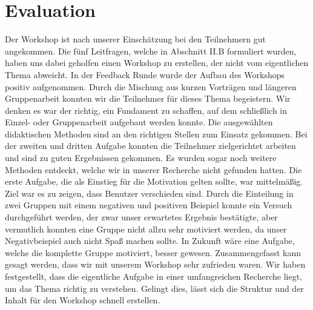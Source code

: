 \section{Evaluation}
Der Workshop ist nach unserer Einschätzung bei den Teilnehmern gut angekommen. Die fünf Leitfragen, welche in Abschnitt II.B formuliert wurden, haben uns dabei geholfen einen Workshop zu erstellen, der nicht vom eigentlichen Thema abweicht. 
In der Feedback Runde wurde der Aufbau des Workshops positiv aufgenommen. Durch die Mischung aus kurzen Vorträgen und längeren Gruppenarbeit konnten wir die Teilnehmer für dieses Thema begeistern. Wir denken es war der richtig, ein Fundament zu schaffen, auf dem schließlich in Einzel- oder Gruppenarbeit aufgebaut werden konnte. 
Die ausgewählten didaktischen Methoden sind an den richtigen Stellen zum Einsatz gekommen. Bei der zweiten und dritten Aufgabe konnten die Teilnehmer zielgerichtet arbeiten und sind zu guten Ergebnissen gekommen. Es wurden sogar noch weitere Methoden entdeckt, welche wir in unserer Recherche nicht gefunden hatten.  Die erste Aufgabe, die als Einstieg für die Motivation gelten sollte, war mittelmäßig. Ziel war es zu zeigen, dass Benutzer verschieden sind. Durch die Einteilung in zwei Gruppen mit einem negativen und positiven Beispiel konnte ein Versuch durchgeführt werden, der zwar unser erwartetes Ergebnis bestätigte, aber vermutlich konnten eine Gruppe nicht allzu sehr motiviert werden, da unser Negativbeispiel auch nicht Spaß machen sollte. In Zukunft wäre eine Aufgabe, welche die komplette Gruppe motiviert, besser gewesen. 
Zusammengefasst kann gesagt werden, dass wir mit unserem Workshop sehr zufrieden waren. Wir haben festgestellt, dass die eigentliche Aufgabe in einer umfangreichen Recherche liegt, um das Thema richtig zu verstehen. Gelingt dies, lässt sich die Struktur und der Inhalt für den Workshop schnell erstellen.
  